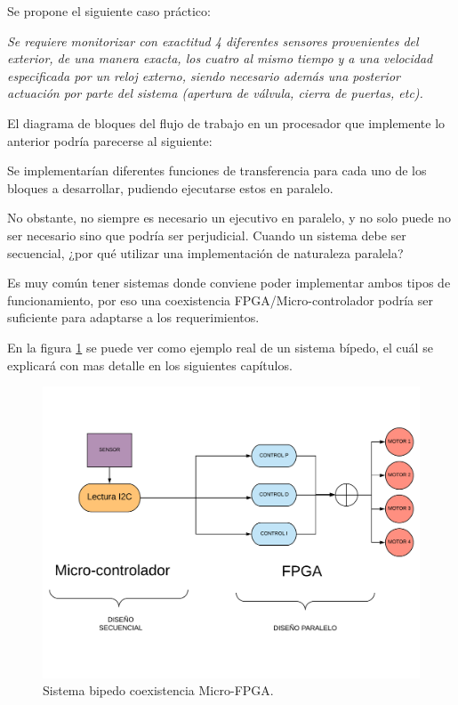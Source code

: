 Se propone el siguiente caso práctico:\newline

\textsl{Se requiere monitorizar con exactitud 4 diferentes sensores provenientes del exterior, de una manera exacta, los cuatro al mismo tiempo y a una velocidad especificada por un reloj externo, siendo necesario además una posterior actuación por parte del sistema (apertura de válvula, cierra de puertas, etc).}\newline

El diagrama de bloques del flujo de trabajo en un procesador que implemente lo anterior podría parecerse al siguiente:




Se implementarían diferentes funciones de transferencia para cada uno de los bloques a desarrollar, pudiendo ejecutarse estos en paralelo. \newline

No obstante, no siempre es necesario un ejecutivo en paralelo, y no solo puede no ser necesario sino que podría ser perjudicial. Cuando un sistema debe ser secuencial, ¿por qué utilizar una implementación de naturaleza paralela? \newline

Es muy común tener sistemas donde conviene poder implementar ambos tipos de funcionamiento, por eso una coexistencia FPGA/Micro-controlador podría ser suficiente para adaptarse a los requerimientos. \newline

En la figura \ref{fig:bipedo} se puede ver como ejemplo real de un sistema bípedo, el cuál se explicará con mas detalle en los siguientes capítulos.

\begin{center}
	\begin{figure}[H]
		\center
		\includegraphics[scale=0.5]{imagenes/EstadoArte/bipedo.pdf}
		\caption{Sistema bipedo coexistencia Micro-FPGA.}
		\label{fig:bipedo}
	\end{figure}
\end{center}
